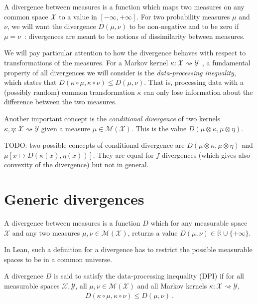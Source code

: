 A divergence between measures is a function which maps two measures on any common space $\mathcal X$ to a value in $[-\infty, +\infty]$.
For two probability measures $\mu$ and $\nu$, we will want the divergence $D(\mu, \nu)$ to be non-negative and to be zero if $\mu = \nu$~: divergences are meant to be notions of dissimilarity between measures.

We will pay particular attention to how the divergence behaves with respect to transformations of the measures.
For a Markov kernel $\kappa : \mathcal X \rightsquigarrow \mathcal Y$~, a fundamental property of all divergences we will consider is the \emph{data-processing inequality}, which states that $D(\kappa \circ \mu, \kappa \circ \nu) \le D(\mu, \nu)$.
That is, processing data with a (possibly random) common transformation $\kappa$ can only lose information about the difference between the two measures.

Another important concept is the \emph{conditional divergence} of two kernels $\kappa, \eta : \mathcal X \rightsquigarrow \mathcal Y$ given a measure $\mu \in \mathcal M(\mathcal X)$. This is the value $D(\mu \otimes \kappa, \mu \otimes \eta)$.

TODO: two possible concepts of conditional divergence are $D(\mu \otimes \kappa, \mu \otimes \eta)$ and $\mu\left[x \mapsto D(\kappa(x), \eta(x))\right]$. They are equal for $f$-divergences (which gives also convexity of the divergence) but not in general. 

\section{Generic divergences}

\begin{definition}[Divergence]
  \label{def:div}
  \uses{}
  A divergence between measures is a function $D$ which for any measurable space $\mathcal X$ and any two measures $\mu, \nu \in \mathcal M(\mathcal X)$, returns a value $D(\mu, \nu) \in \mathbb{R} \cup \{+\infty\}$.
\end{definition}

In Lean, such a definition for a divergence has to restrict the possible measurable spaces to be in a common universe.

\begin{definition}
  \label{def:dpi}
  A divergence $D$ is said to satisfy the data-processing inequality (DPI) if for all measurable spaces $\mathcal X, \mathcal Y$, all $\mu, \nu \in \mathcal M(\mathcal X)$ and all Markov kernels $\kappa : \mathcal X \rightsquigarrow \mathcal Y$,
  \begin{align*}
  D(\kappa \circ \mu, \kappa \circ \nu) \le D(\mu, \nu) \: .
  \end{align*}
\end{definition}


